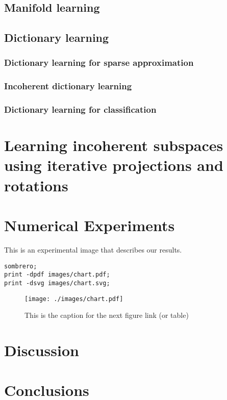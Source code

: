 \documentclass[]{article}
\begin{document}
\subsection{Manifold learning}
\label{sec-2-2}
\subsection{Dictionary learning}
\label{sec-2-3}
\subsubsection{Dictionary learning for sparse approximation}
\label{sec-2-3-1}
\subsubsection{Incoherent dictionary learning}
\label{sec-2-3-2}
\subsubsection{Dictionary learning for classification}
\label{sec-2-3-3}

\section{Learning incoherent subspaces using iterative projections and rotations}
\label{sec-3}
\section{Numerical Experiments}
\label{sec-4}
This is an experimental image that describes our results.
\begin{verbatim}
sombrero;
print -dpdf images/chart.pdf;
print -dsvg images/chart.svg;
\end{verbatim}


\begin{figure}[htb]
\centering
\texttt{[image: ./images/chart.pdf]}
\caption{\label{fig:SED-HR4049}This is the caption for the next figure link (or table)}
\end{figure}
\section{Discussion}
\label{sec-5}
\section{Conclusions}
\label{sec-6}



\end{document}
